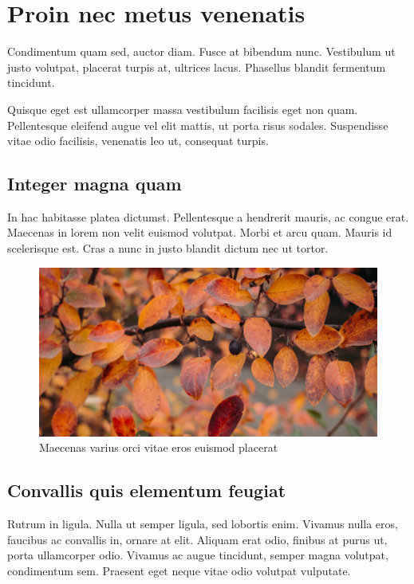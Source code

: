 \section{Proin nec metus venenatis} \label{sec:proin}

Condimentum quam sed, auctor diam. Fusce at bibendum nunc. Vestibulum ut justo
volutpat, placerat turpis at, ultrices lacus. Phasellus blandit fermentum tincidunt.

Quisque eget est ullamcorper massa vestibulum facilisis eget non quam. Pellentesque
eleifend augue vel elit mattis, ut porta risus sodales. Suspendisse vitae odio
facilisis, venenatis leo ut, consequat turpis.

\subsection{Integer magna quam}

In hac habitasse platea dictumst. Pellentesque a hendrerit mauris, ac congue
erat. Maecenas in lorem non velit euismod volutpat. Morbi et arcu quam. Mauris
id scelerisque est. Cras a nunc in justo blandit dictum nec ut tortor.

\begin{figure}[hb]
\centering\includegraphics[scale=1]{images/orange2.jpg}
\caption{Maecenas varius orci vitae eros euismod placerat} \label{fig:integer}
\end{figure}

\subsection{Convallis quis elementum feugiat}

Rutrum in ligula. Nulla ut semper ligula, sed lobortis enim. Vivamus nulla eros,
faucibus ac convallis in, ornare at elit. Aliquam erat odio, finibus at purus ut,
porta ullamcorper odio. Vivamus ac augue tincidunt, semper magna volutpat,
condimentum sem. Praesent eget neque vitae odio volutpat vulputate.


